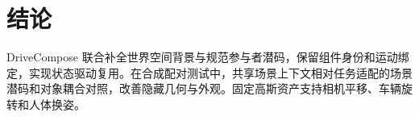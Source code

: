 \section{结论}
\label{sec:conclusion}

DriveCompose 联合补全世界空间背景与规范参与者潜码，保留组件身份和运动绑定，实现状态驱动复用。在合成配对测试中，共享场景上下文相对任务适配的场景潜码和对象耦合对照，改善隐藏几何与外观。固定高斯资产支持相机平移、车辆旋转和人体换姿。
\label{sec:main-text-end}
